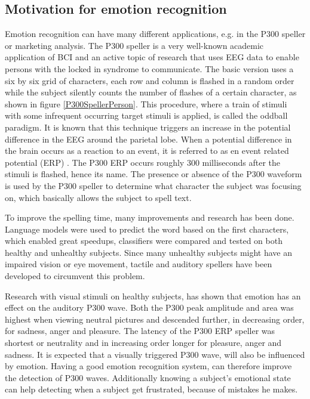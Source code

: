\subsection{Motivation for emotion recognition}
Emotion recognition can have many different applications, e.g. in the P300 speller or marketing analysis. The P300 speller is a very well-known academic application of BCI and an active topic of research that uses EEG data to enable persons with the locked in syndrome to communicate\cite{P300Origin}. The basic version uses a six by six grid of characters, each row and column is flashed in a random order while the subject silently counts the number of flashes of a certain character, as shown in figure \ref{P300SpellerPerson}. This procedure, where a train of stimuli with some infrequent occurring target stimuli is applied, is called the oddball paradigm\cite{PaperThibault}. It is known that this technique triggers an increase in the potential difference in the EEG around the parietal lobe. When a potential difference in the brain occurs as a reaction to an event, it is referred to as en event related potential (ERP) . The P300 ERP occurs roughly 300 milliseconds after the stimuli is flashed, hence its name\citep{ComparisonClassifications}. The presence or absence of the P300 waveform is used by the P300 speller to determine what character the subject was focusing on, which basically allows the subject to spell text. 


To improve the spelling time, many improvements and research has been done. Language models were used to predict the word based on the first characters, which enabled great speedups\cite{LangModel}, classifiers were compared and tested on both healthy\cite{ClassTechniqueComp} and unhealthy subjects\cite{ComparisonClassifications}. Since many unhealthy subjects might have an impaired vision or eye movement, tactile\cite{TactileP300} and auditory\cite{AuditoryP300} spellers have been developed to circumvent this problem.

\npar

Research with visual stimuli on healthy subjects, has shown that emotion has an effect on the auditory P300 wave\cite{AuditoryP300Effect}. Both the P300 peak amplitude and area was highest when viewing neutral pictures and descended further, in decreasing order, for sadness, anger and pleasure. The latency of the P300 ERP speller was shortest or neutrality and in increasing order longer for pleasure, anger and sadness. It is expected that a visually triggered P300 wave, will also be influenced by emotion. Having a good emotion recognition system, can therefore improve the detection of P300 waves. Additionally knowing a subject's emotional state can help detecting when a subject get frustrated, because of mistakes he makes. 

